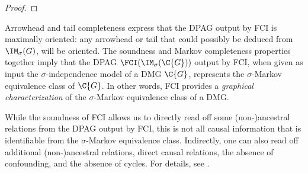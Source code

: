 \begin{proof}

\end{proof}
Arrowhead and tail completeness express that the DPAG output by FCI is maximally oriented: any arrowhead or tail that could possibly be deduced from $\IM_\sigma(G)$, will be oriented.
The soundness and Markov completeness properties together imply that the DPAG $\FCI(\IM_\sigma(\C{G}))$ output by FCI, when given as input the $\sigma$-independence model of a DMG $\C{G}$, represents the $\sigma$-Markov equivalence class of $\C{G}$.
In other words, FCI provides a \emph{graphical characterization} of the $\sigma$-Markov equivalence class of a DMG.

While the soundness of FCI allows us to directly read off some (non-)ancestral relations from the DPAG output by FCI, 
this is not all causal information that is identifiable from the $\sigma$-Markov equivalence class. 
Indirectly, one can also read off additional (non-)ancestral relations, direct causal relations, the absence of confounding, and the absence of cycles. 
For details, see \cite{MooijClaassen_UAI_20}.

